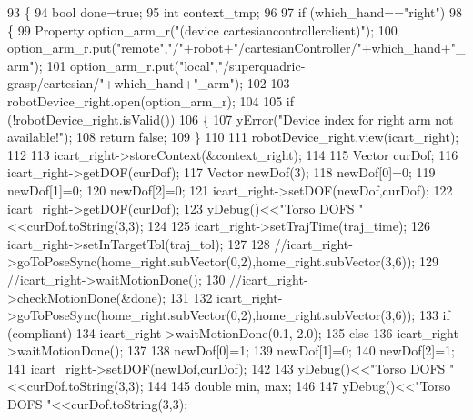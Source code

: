 \begin{DoxyCode}
93 \{
94     \textcolor{keywordtype}{bool} done=\textcolor{keyword}{true};
95     \textcolor{keywordtype}{int} context\_tmp;
96 
97     \textcolor{keywordflow}{if} (which\_hand==\textcolor{stringliteral}{"right"})
98     \{
99         Property option\_arm\_r(\textcolor{stringliteral}{"(device cartesiancontrollerclient)"});
100         option\_arm\_r.put(\textcolor{stringliteral}{"remote"},\textcolor{stringliteral}{"/"}+robot+\textcolor{stringliteral}{"/cartesianController/"}+which\_hand+\textcolor{stringliteral}{"\_arm"});
101         option\_arm\_r.put(\textcolor{stringliteral}{"local"},\textcolor{stringliteral}{"/superquadric-grasp/cartesian/"}+which\_hand+\textcolor{stringliteral}{"\_arm"});
102 
103         robotDevice\_right.open(option\_arm\_r);
104 
105         \textcolor{keywordflow}{if} (!robotDevice\_right.isValid())
106         \{
107             yError(\textcolor{stringliteral}{"Device index for right arm not available!"});
108             \textcolor{keywordflow}{return} \textcolor{keyword}{false};
109         \}
110 
111         robotDevice\_right.view(icart\_right);
112 
113         icart\_right->storeContext(&context_right);
114 
115         Vector curDof;
116         icart\_right->getDOF(curDof);
117         Vector newDof(3);
118         newDof[0]=0;
119         newDof[1]=0;
120         newDof[2]=0;
121         icart\_right->setDOF(newDof,curDof);
122         icart\_right->getDOF(curDof);
123         yDebug()<<\textcolor{stringliteral}{"Torso DOFS "}<<curDof.toString(3,3);
124 
125         icart\_right->setTrajTime(traj_time);
126         icart\_right->setInTargetTol(traj_tol);
127 
128         \textcolor{comment}{//icart\_right->goToPoseSync(home\_right.subVector(0,2),home\_right.subVector(3,6));}
129         \textcolor{comment}{//icart\_right->waitMotionDone();}
130         \textcolor{comment}{//icart\_right->checkMotionDone(&done);}
131 
132         icart\_right->goToPoseSync(home_right.subVector(0,2),home_right.subVector(3,6));
133         \textcolor{keywordflow}{if} (compliant)
134             icart\_right->waitMotionDone(0.1, 2.0);
135         \textcolor{keywordflow}{else}
136             icart\_right->waitMotionDone();
137 
138         newDof[0]=1;
139         newDof[1]=0;
140         newDof[2]=1;
141         icart\_right->setDOF(newDof,curDof);
142 
143         yDebug()<<\textcolor{stringliteral}{"Torso DOFS "}<<curDof.toString(3,3);
144 
145         \textcolor{keywordtype}{double} min, max;
146 
147         yDebug()<<\textcolor{stringliteral}{"Torso DOFS "}<<curDof.toString(3,3);

\end{DoxyCode}
